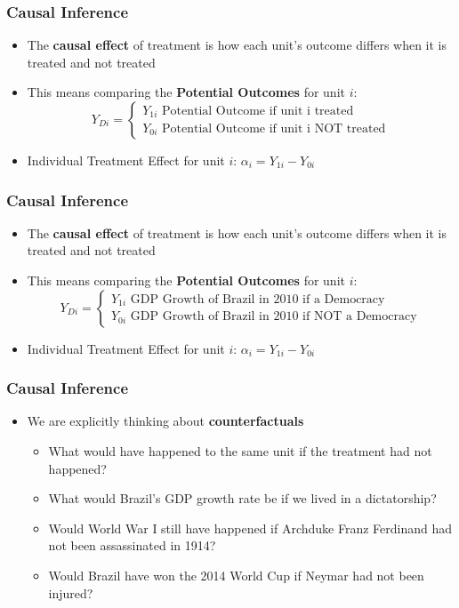 \documentclass[xcolor=x11names,compress]{beamer}\usepackage[]{graphicx}\usepackage[]{color}
\renewcommand{\(}{\begin{columns}}
\renewcommand{\)}{\end{columns}}
\newcommand{\<}[1]{\begin{column}{#1}}
\renewcommand{\>}{\end{column}}
\begin{document}
\begin{frame}
\frametitle{Causal Inference}
\begin{itemize}
\item The \textbf{causal effect} of treatment is how each unit's outcome differs when it is treated and not treated
\pause
\item This means comparing the \textbf{Potential Outcomes} for unit $i$:
\[
Y_{Di} = 
\begin{cases}
Y_{1i}\text{   Potential Outcome if unit i treated} \\
Y_{0i}\text{   Potential Outcome if unit i NOT treated}
\end{cases}
\]
\pause
\item Individual Treatment Effect for unit $i$: $\alpha_i = Y_{1i} - Y_{0i}$
\end{itemize}
\end{frame}

\begin{frame}
\frametitle{Causal Inference}
\begin{itemize}
\item The \textbf{causal effect} of treatment is how each unit's outcome differs when it is treated and not treated
\item This means comparing the \textbf{Potential Outcomes} for unit $i$:
\[
Y_{Di} = 
\begin{cases}
Y_{1i}\text{   GDP Growth of Brazil in 2010 if a Democracy} \\
Y_{0i}\text{   GDP Growth of Brazil in 2010 if NOT a Democracy}
\end{cases}
\]
\item Individual Treatment Effect for unit $i$: $\alpha_i = Y_{1i} - Y_{0i}$
\end{itemize}
\end{frame}

\begin{frame}
\frametitle{Causal Inference}
\begin{itemize}
\item We are explicitly thinking about \textbf{counterfactuals}
\pause
\begin{itemize}
\item What would have happened to the same unit if the treatment had not happened?
\pause
\item What would Brazil's GDP growth rate be if we lived in a dictatorship?
\pause
\item Would World War I still have happened if Archduke Franz Ferdinand had not been assassinated in 1914?
\pause
\item Would Brazil have won the 2014 World Cup if Neymar had not been injured?
\pause
\end{itemize}
\end{itemize}
\end{frame}
\end{document}
